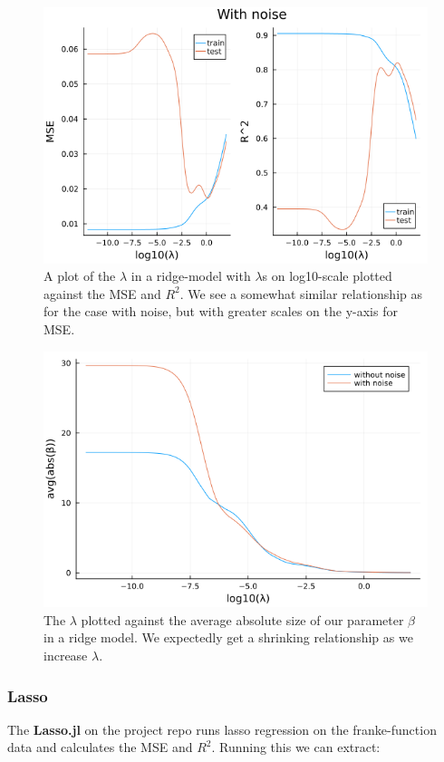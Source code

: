 \documentclass{article}
\begin{document}
\begin{figure}
    \centerline{\includegraphics[scale=0.5]{ridge_with_noise}}
    \caption{A plot of the $\lambda$ in a ridge-model with $\lambda$s on log10-scale plotted against the MSE and $R^2$. We see a somewhat similar relationship as for the case with noise, but with greater scales on the y-axis for MSE.}
    \label{Ridge-no-noise}
\end{figure}

\begin{figure}
    \centerline{\includegraphics[scale=0.5]{ridge_beta_size}}
    \caption{The $\lambda$ plotted against the average absolute size of our parameter $\beta$ in a ridge model. We expectedly get a shrinking relationship as we increase $\lambda$.}
    \label{Ridge-beta-sizes}
\end{figure}

\subsubsection{Lasso}
The \textbf{Lasso.jl} on the project repo \cite{githubrepoproject1} runs lasso
regression on the franke-function data and calculates the MSE and $R^2$. Running
this we can extract:
\end{document}
